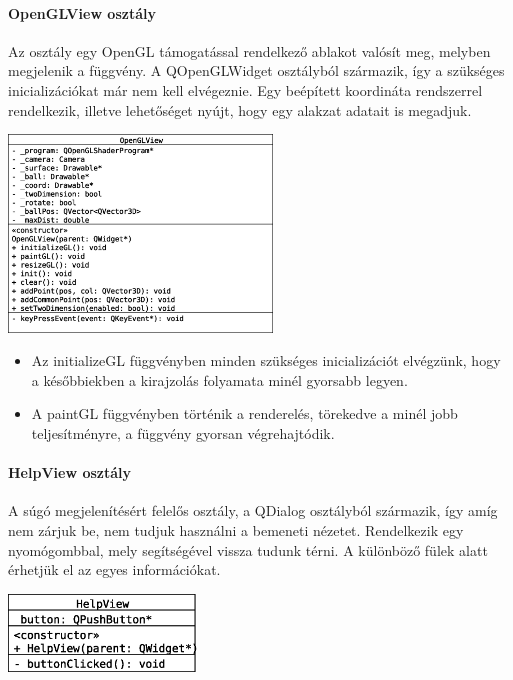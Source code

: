 \documentclass[12pt]{report}
\begin{document}
\paragraph{OpenGLView osztály}
Az osztály egy OpenGL támogatással rendelkező ablakot valósít meg, melyben megjelenik a függvény. A QOpenGLWidget osztályból származik, így a szükséges inicializációkat már nem kell elvégeznie. Egy beépített koordináta rendszerrel rendelkezik, illetve lehetőséget nyújt, hogy egy alakzat adatait is megadjuk.
\begin{center}
\includegraphics[width=7cm]{pics/uml/OpenGLView}
\end{center}
\begin{itemize}
\item Az initializeGL függvényben minden szükséges inicializációt elvégzünk, hogy a későbbiekben a kirajzolás folyamata minél gyorsabb legyen.
\item A paintGL függvényben történik a renderelés, törekedve a minél jobb teljesítményre, a függvény gyorsan végrehajtódik.
\end{itemize}

\paragraph{HelpView osztály}
A súgó megjelenítésért felelős osztály, a QDialog osztályból származik, így amíg nem zárjuk be, nem tudjuk használni a bemeneti nézetet. Rendelkezik egy nyomógombbal, mely segítségével vissza tudunk térni. A különböző fülek alatt érhetjük el az egyes információkat.
\begin{center}
\includegraphics[width=5cm]{pics/uml/HelpView}
\end{center}
\end{document}

